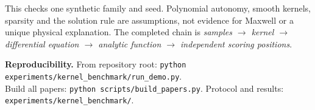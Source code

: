 \documentclass[11pt,letterpaper]{article}
\begin{document}
This checks one synthetic family and seed. Polynomial autonomy, smooth kernels,
sparsity and the solution rule are assumptions, not evidence for Maxwell or a unique
physical explanation. The completed chain is \emph{samples $\to$ kernel $\to$
differential equation $\to$ analytic function $\to$ independent scoring positions}.

\vfill
{\footnotesize\raggedright\textbf{Reproducibility.}
From repository root: \texttt{python experiments/kernel\_benchmark/run\_demo.py}.\\
Build all papers: \texttt{python scripts/build\_papers.py}.
Protocol and results: \texttt{experiments/kernel\_benchmark/}.\par}
\end{document}
